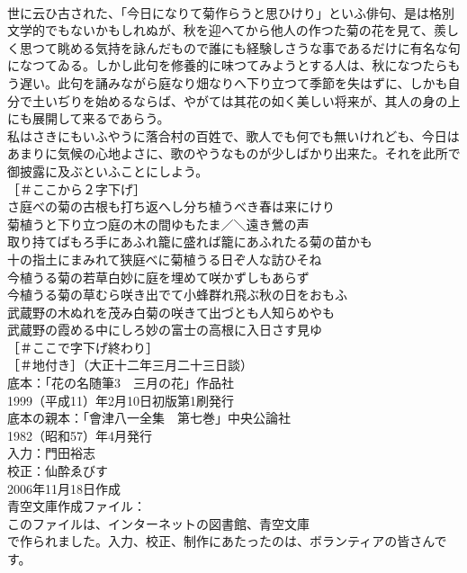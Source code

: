 \documentclass[8pt]{extreport}
\begin{document}
\begin{CJK}{UTF8}{min}
\\	世に云ひ古された、「今日になりて菊作らうと思ひけり」といふ俳句、是は格別文学的でもないかもしれぬが、秋を迎へてから他人の作つた菊の花を見て、羨しく思つて眺める気持を詠んだもので誰にも経験しさうな事であるだけに有名な句になつてゐる。しかし此句を修養的に味つてみようとする人は、秋になつたらもう遅い。此句を誦みながら庭なり畑なりへ下り立つて季節を失はずに、しかも自分で土いぢりを始めるならば、やがては其花の如く美しい将来が、其人の身の上にも展開して来るであらう。
\\	私はさきにもいふやうに落合村の百姓で、歌人でも何でも無いけれども、今日はあまりに気候の心地よさに、歌のやうなものが少しばかり出来た。それを此所で御披露に及ぶといふことにしよう。
\\	［＃ここから２字下げ］
\\	さ庭べの菊の古根も打ち返へし分ち植うべき春は来にけり
\\	菊植うと下り立つ庭の木の間ゆもたま／＼遠き鶯の声
\\	取り持てばもろ手にあふれ籠に盛れば籠にあふれたる菊の苗かも
\\	十の指土にまみれて狭庭べに菊植うる日ぞ人な訪ひそね
\\	今植うる菊の若草白妙に庭を埋めて咲かずしもあらず
\\	今植うる菊の草むら咲き出でて小蜂群れ飛ぶ秋の日をおもふ
\\	武蔵野の木ぬれを茂み白菊の咲きて出づとも人知らめやも
\\	武蔵野の霞める中にしろ妙の富士の高根に入日さす見ゆ
\\	［＃ここで字下げ終わり］
\\	［＃地付き］（大正十二年三月二十三日談）
\\	底本：「花の名随筆3　三月の花」作品社
\\	1999（平成11）年2月10日初版第1刷発行
\\	底本の親本：「會津八一全集　第七巻」中央公論社
\\	1982（昭和57）年4月発行
\\	入力：門田裕志
\\	校正：仙酔ゑびす
\\	2006年11月18日作成
\\	青空文庫作成ファイル：
\\	このファイルは、インターネットの図書館、青空文庫
\\	で作られました。入力、校正、制作にあたったのは、ボランティアの皆さんです。
\end{CJK}
\end{document}
